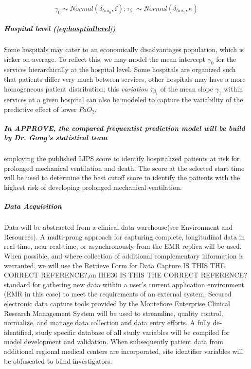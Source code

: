\documentclass[11pt,notitlepage]{article}
\begin{document}
\begin{figure}
\vspace{-10pt}
\begin{equation} \label{eq:hosptiallevel}
\gamma_0 \sim Normal (\delta_{tau_{0}}, \zeta); \tau_{\beta_1} \sim Normal(\delta_{tau_{1}}, \kappa) 
\end{equation}
\vspace{-25pt}
\end{figure}

\subparagraph*{Hospital level (\ref{eq:hosptiallevel})}
Some hospitals may cater to an economically disadvantages population, which is sicker on average. To reflect this, we may  model the mean intercept $\gamma_0$ for the services hierarchically at the hospital level. Some hospitals are organized such that patients differ very much between services, other hospitals may have a more homogeneous patient distribution; this \textit{variation} $\tau_{\beta_1}$ of the mean slope $\gamma_1$ within services at a given hospital can also be modeled to capture the variability of the predictive effect of lower $PaO_2$.
 
\subparagraph*{In APPROVE, the compared frequentist prediction model will be build by Dr. Gong's statistical team} employing the published LIPS score \cite{Herridge_12594312} to identify hospitalized patients at risk for prolonged mechanical ventilation and death. The score at the selected start time will be used to determine the best cutoff score to identify the patients with the highest risk of developing prolonged mechanical ventilation.

\subparagraph*{Data Acquisition}
Data will be abstracted from a clinical data warehouse(see Environment and Resources). A multi-prong approach for capturing complete, longitudinal data in real-time, near real-time, or asynchronously from the EMR replica will be used. When possible, and where collection of additional complementary information is warranted, we will use the Retrieve Form for Data Capture IS THIS THE CORRECT REFERENCE?\cite{Rothenhaeusler_2005},an IHE30 IS THIS THE CORRECT REFERENCE? \cite{Rotte_15809512} standard for gathering new data within a user's current application environment (EMR in this case) to meet the requirements of an external system. Secured electronic data capture tools provided by the Montefiore Enterprise Clinical Research Management System will be used to streamline, quality control, normalize, and manage data collection and data entry efforts. A fully de-identified, study specific database of all study variables will be compiled for model development and validation. When subsequently patient data from additional regional medical centers are incorporated, site identifier variables will be obfuscated to blind investigators.
\end{document}
